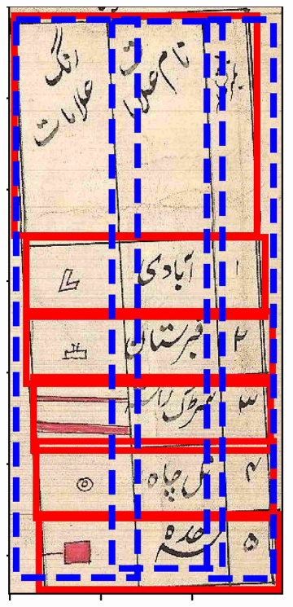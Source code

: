 \begin{figure}[h!]
\centering
\begin{subfigure}{0.325\linewidth}
  \centering
  \includegraphics[width=\linewidth]{detection_massavi_1525.jpg}

\end{subfigure}
\end{figure}
